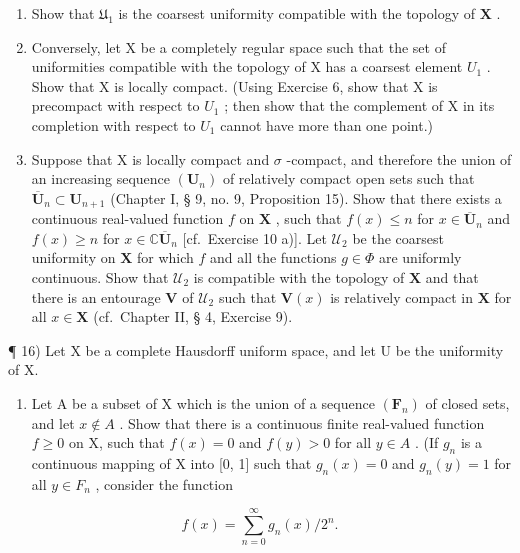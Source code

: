 \begin{enumerate}
\def\labelenumi{\alph{enumi})}
\setcounter{enumi}{1}
\item
  Show that \(\mathfrak{U}_1\) is the coarsest uniformity compatible with the topology of \(\mathbf{X}\) .
\item
  Conversely, let X be a completely regular space such that the set of uniformities compatible with the topology of X has a coarsest element \(U_{1}\) . Show that X is locally compact. (Using Exercise 6, show that X is precompact with respect to \(U_{1}\) ; then show that the complement of X in its completion with respect to \(U_{1}\) cannot have more than one point.)
\item
  Suppose that X is locally compact and \(\sigma\) -compact, and therefore the union of an increasing sequence \((\mathbf{U}_n)\) of relatively compact open sets such that \(\overline{\mathbf{U}}_n \subset \mathbf{U}_{n+1}\) (Chapter I, § 9, no. 9, Proposition 15). Show that there exists a continuous real-valued function \(f\) on \(\mathbf{X}\) , such that \(f(x) \leqslant n\) for \(x \in \overline{\mathbf{U}}_n\) and \(f(x) \geqslant n\) for \(x \in \mathbb{C} \overline{\mathbf{U}}_n\) {[}cf.~Exercise 10 a){]}. Let \(\mathcal{U}_2\) be the coarsest uniformity on \(\mathbf{X}\) for which \(f\) and all the functions \(g \in \Phi\) are uniformly continuous. Show that \(\mathcal{U}_2\) is compatible with the topology of \(\mathbf{X}\) and that there is an entourage \(\mathbf{V}\) of \(\mathcal{U}_2\) such that \(\mathbf{V}(x)\) is relatively compact in \(\mathbf{X}\) for all \(x \in \mathbf{X}\) (cf.~Chapter II, § 4, Exercise 9).
\end{enumerate}

¶ 16) Let X be a complete Hausdorff uniform space, and let U be the uniformity of X.

\begin{enumerate}
\def\labelenumi{\alph{enumi})}
\tightlist
\item
  Let A be a subset of X which is the union of a sequence \((\mathbf{F}_{n})\) of closed sets, and let \(x \notin A\) . Show that there is a continuous finite real-valued function \(f \geqslant 0\) on X, such that \(f(x) = 0\) and \(f(y) > 0\) for all \(y \in A\) . (If \(g_{n}\) is a continuous mapping of X into {[}0, 1{]} such that \(g_{n}(x) = 0\) and \(g_{n}(y) = 1\) for all \(y \in F_{n}\) , consider the function
\end{enumerate}

\[
f (x) = \sum_ {n = 0} ^ {\infty} g _ {n} (x) / 2 ^ {n}.
\]

